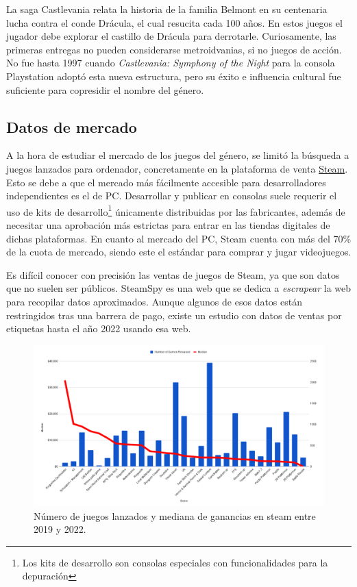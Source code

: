 La saga Castlevania relata la historia de la familia Belmont en su centenaria lucha contra el conde Drácula, el cual resucita cada 100 años. En estos juegos el jugador debe explorar el castillo de Drácula para derrotarle. Curiosamente, las primeras entregas no pueden considerarse metroidvanias, si no juegos de acción. No fue hasta 1997 cuando \textit{Castlevania: Symphony of the Night} para la consola Playstation adoptó esta nueva estructura, pero su éxito e influencia cultural fue suficiente para copresidir el nombre del género.

\subsection{Datos de mercado}

A la hora de estudiar el mercado de los juegos del género, se limitó la búsqueda a juegos lanzados para ordenador, concretamente en la plataforma de venta \href{https://store.steampowered.com/?l=spanish}{Steam}. Esto se debe a que el mercado más fácilmente accesible para desarrolladores independientes es el de PC. Desarrollar y publicar en consolas suele requerir el uso de kits de desarrollo\footnote{Los kits de desarrollo son consolas especiales con funcionalidades para la depuración} únicamente distribuidas por las fabricantes, además de necesitar una aprobación más estrictas para entrar en las tiendas digitales de dichas plataformas. En cuanto al mercado del PC, Steam cuenta con más del 70\% de la cuota de mercado\cite{pc-market-share}, siendo este el estándar para comprar y jugar videojuegos.

Es difícil conocer con precisión las ventas de juegos de Steam, ya que son datos que no suelen ser públicos. SteamSpy\cite{steamspy} es una web que se dedica a \textit{escrapear} la web para recopilar datos aproximados. Aunque algunos de esos datos están restringidos tras una barrera de pago, existe un estudio\cite{steamgames-genre} con datos de ventas por etiquetas hasta el año 2022 usando esa web.

\begin{figure}[h]
    \centering
    \includegraphics[scale=0.28]{img/genres-chart.png}
    \caption[Datos de venta por género en steam]{Número de juegos lanzados y mediana de ganancias en steam entre 2019 y 2022.}
    \label{fig:steamgenreschart}
\end{figure}

